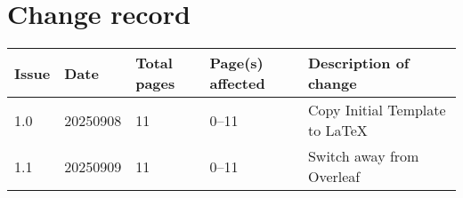
\section*{Change record}
\begin{table}[htp]
\centering
\renewcommand{\arraystretch}{1.2} %
\begin{tabularx}{\textwidth}{|l|l|l|l|X|}
\hline
Issue & Date & Total pages & Page(s) affected & Description of change \\
\hline
1.0 & 20250908 & 11 & 0--11 & Copy Initial Template to LaTeX \\
\hline
1.1 & 20250909 & 11 & 0--11 & Switch away from Overleaf \\
\hline
\end{tabularx}
\end{table}

